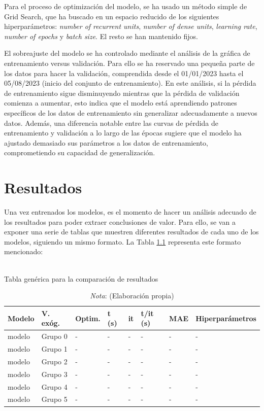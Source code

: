 \documentclass[12pt,a4paper]{report}
\begin{document}
Para el proceso de optimización del modelo, se ha usado un método simple de Grid Search, que ha buscado en un espacio reducido de los siguientes hiperparámetros: \textit{number of recurrent units}, \textit{number of dense units}, \textit{learning rate}, \textit{number of epochs} y \textit{batch size}. El resto se han mantenido fijos. 

El sobreajuste del modelo se ha controlado mediante el análisis de la gráfica de entrenamiento versus validación. Para ello se ha reservado una pequeña parte de los datos para hacer la validación, comprendida desde el 01/01/2023 hasta el 05/08/2023 (inicio del conjunto de entrenamiento). En este análisis, si la pérdida de entrenamiento sigue disminuyendo mientras que la pérdida de validación comienza a aumentar, esto indica que el modelo está aprendiendo patrones específicos de los datos de entrenamiento sin generalizar adecuadamente a nuevos datos. Además, una diferencia notable entre las curvas de pérdida de entrenamiento y validación a lo largo de las épocas sugiere que el modelo ha ajustado demasiado sus parámetros a los datos de entrenamiento, comprometiendo su capacidad de generalización.

\newpage
\chapter{Resultados}\label{cap:cap5}

Una vez entrenados los modelos, es el momento de hacer un análisis adecuado de los resultados para poder extraer conclusiones de valor. Para ello, se van a exponer una serie de tablas que muestren diferentes resultados de cada uno de los modelos, siguiendo un mismo formato. La Tabla \ref{tab:tabla_gen} representa este formato mencionado:

\begin{table}[H]
\centering
\caption{\\ Tabla genérica para la comparación de resultados}
\renewcommand{\arraystretch}{1.5}
\scriptsize
\begin{tabular}{m{1cm} m{1.2cm} m{1.2cm} m{1cm} m{1cm} m{1.2cm} m{1.2cm} m{3.5cm}} 
\toprule
\textbf{Modelo} & \textbf{V. exóg.} & \textbf{Optim.} & \textbf{t (s)} & \textbf{it} & \textbf{t/it (s)} & \textbf{MAE} & \textbf{Hiperparámetros} \\
\midrule
modelo & Grupo 0 & - & - & - & - & - & - \\[0.5em]
\hline
modelo & Grupo 1 & - & - & - & - & - & - \\[0.5em]
\hline
modelo & Grupo 2 & - & - & - & - & - & - \\[0.5em]
\hline
modelo & Grupo 3 & - & - & - & - & - & - \\[0.5em]
\hline
modelo & Grupo 4 & - & - & - & - & - & - \\[0.5em]
\hline
modelo & Grupo 5 & - & - & - & - & - & - \\
\bottomrule
\end{tabular}
\label{tab:tabla_gen}
\caption*{\textit{Nota}: (Elaboración propia)}
\end{table}
\end{document}
